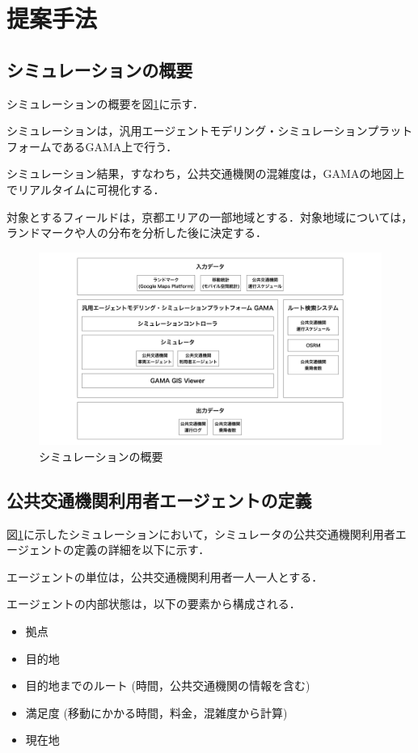 \section{提案手法}
\label{section_method}
\subsection{シミュレーションの概要}
シミュレーションの概要を図\ref{fig_simulation}に示す．

シミュレーションは，汎用エージェントモデリング・シミュレーションプラットフォームであるGAMA上で行う．

シミュレーション結果，すなわち，公共交通機関の混雑度は，GAMAの地図上でリアルタイムに可視化する．

対象とするフィールドは，京都エリアの一部地域とする．対象地域については，ランドマークや人の分布を分析した後に決定する．

\begin{figure}[H]
  \begin{center}
    \includegraphics[width=1.0\linewidth]{assets/simulation_summary.png}
    \caption{シミュレーションの概要}
    \label{fig_simulation}
  \end{center}
\end{figure}

\subsection{公共交通機関利用者エージェントの定義}
\label{section_agent}
図\ref{fig_simulation}に示したシミュレーションにおいて，シミュレータの公共交通機関利用者エージェントの定義の詳細を以下に示す．

エージェントの単位は，公共交通機関利用者一人一人とする．

エージェントの内部状態は，以下の要素から構成される．
\begin{itemize}
  \item 拠点
  \item 目的地
  \item 目的地までのルート (時間，公共交通機関の情報を含む)
  \item 満足度 (移動にかかる時間，料金，混雑度から計算)
  \item 現在地
\end{itemize}

